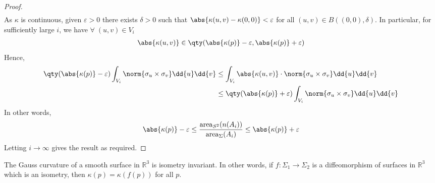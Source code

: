 \begin{proof}
\begin{align*}
	\end{align*}
	As $\kappa$ is continuous, given $\varepsilon > 0$ there exists $\delta > 0$ such that $\abs{\kappa(u,v) - \kappa(0,0)} < \varepsilon$ for all $(u,v) \in B((0,0), \delta)$.
	In particular, for sufficiently large $i$, we have $\forall \; (u, v) \in V_i$
	\begin{align*}
		\abs{\kappa(u,v)} \in \qty(\abs{\kappa(p)}-\varepsilon, \abs{\kappa(p)}+\varepsilon)
	\end{align*}
	Hence,
	\begin{align*}
		\qty(\abs{\kappa(p)}-\varepsilon) \int_{V_i} \norm{\sigma_u \times \sigma_v} \dd{u}\dd{v} &\leq \int_{V_i} \abs{\kappa(u,v)} \cdot \norm{\sigma_u \times \sigma_v} \dd{u}\dd{v} \\
		&\leq \qty(\abs{\kappa(p)}+\varepsilon) \int_{V_i} \norm{\sigma_u \times \sigma_v} \dd{u}\dd{v}
	\end{align*}
	In other words,
	\begin{align*}
		\abs{\kappa(p)}-\varepsilon \leq \frac{\mathrm{area}_{S^2} (n(A_i))}{\mathrm{area}_{\Sigma} (A_i)} \leq \abs{\kappa(p)} + \varepsilon
	\end{align*}
	Letting $i \to \infty$ gives the result as required.
\end{proof}

\begin{theorem}
	The Gauss curvature of a smooth surface in $\mathbb R^3$ is isometry invariant.
	In other words, if $f \colon \Sigma_1 \to \Sigma_2$ is a diffeomorphism of surfaces in $\mathbb R^3$ which is an isometry, then $\kappa(p) = \kappa(f(p))$ for all $p$.
\end{theorem}

